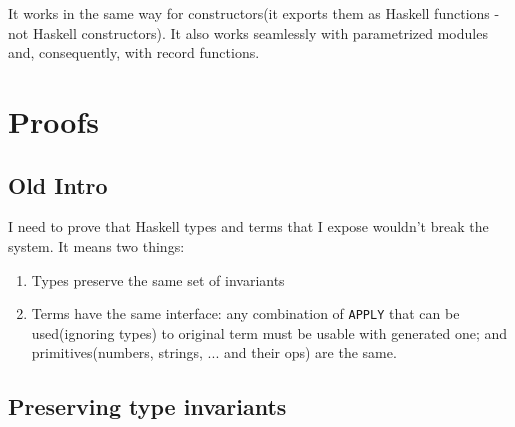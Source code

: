 It works in the same way for constructors(it exports them as Haskell functions - not Haskell constructors).
It also works seamlessly with parametrized modules and, consequently, with record functions.

\section{Proofs}\label{sec:proofs}

\subsection{Old Intro}

I need to prove that Haskell types and terms that I expose wouldn't break the system.  It means two things:
\begin{enumerate}
\item Types preserve the same set of invariants
\item Terms have the same interface: any combination of \texttt{APPLY} that can be used(ignoring types) to original
      term must be usable with generated one; and primitives(numbers, strings, ... and their ops) are the same.
\end{enumerate}

\subsection{Preserving type invariants}

